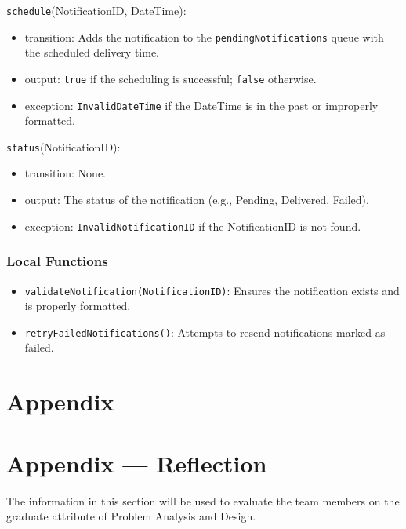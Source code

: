 \documentclass[12pt, titlepage]{article}
\begin{document}
\noindent \texttt{schedule}(NotificationID, DateTime):
\begin{itemize}
    \item transition: Adds the notification to the \texttt{pendingNotifications} queue with the scheduled delivery time.
    \item output: \texttt{true} if the scheduling is successful; \texttt{false} otherwise.
    \item exception: \texttt{InvalidDateTime} if the DateTime is in the past or improperly formatted.
\end{itemize}

\noindent \texttt{status}(NotificationID):
\begin{itemize}
    \item transition: None.
    \item output: The status of the notification (e.g., Pending, Delivered, Failed).
    \item exception: \texttt{InvalidNotificationID} if the NotificationID is not found.
\end{itemize}

\subsubsection{Local Functions}

\begin{itemize}
    \item \texttt{validateNotification(NotificationID)}: Ensures the notification exists and is properly formatted.
    \item \texttt{retryFailedNotifications()}: Attempts to resend notifications marked as failed.
\end{itemize}

\newpage

\section{Appendix} \label{Appendix}


\newpage{}

\section*{Appendix --- Reflection}


The information in this section will be used to evaluate the team members on the
graduate attribute of Problem Analysis and Design.
\end{document}
